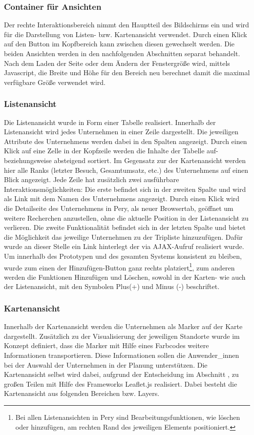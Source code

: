 \documentclass[Bachelorarbeit.tex]{subfiles}
\begin{document}
\subsubsection*{Container für Ansichten}
Der rechte Interaktionsbereich nimmt den Hauptteil des Bildschirms ein und wird für die Darstellung von Listen- bzw. Kartenansicht verwendet. 
Durch einen Klick auf den Button im Kopfbereich kann zwischen diesen gewechselt werden.
Die beiden Ansichten werden in den nachfolgenden Abschnitten separat behandelt.
Nach dem Laden der Seite oder dem Ändern der Fenstergröße wird, mittels Javascript, die Breite und Höhe für den Bereich neu berechnet damit die maximal verfügbare Größe verwendet wird. 

\subsubsection*{Listenansicht}
Die Listenansicht wurde in Form einer Tabelle realisiert.
Innerhalb der Listenansicht wird jedes Unternehmen in einer Zeile dargestellt.
Die jeweiligen Attribute des Unternehmens werden dabei in den Spalten angezeigt.
Durch einen Klick auf eine Zelle in der Kopfzeile werden die Inhalte der Tabelle auf- beziehungsweise absteigend sortiert.
Im Gegensatz zur der Kartenansicht werden hier alle Ranks (letzter Besuch, Gesamtumsatz, etc.) des Unternehmens auf einen Blick angezeigt. 
Jede Zeile hat zusätzlich zwei ausführbare Interaktionsmöglichkeiten:
Die erste befindet sich in der zweiten Spalte und wird als Link mit dem Namen des Unternehmens angezeigt. 
Durch einen Klick wird die Detailseite des Unternehmens in Pery, als neuer Browsertab, geöffnet um weitere Recherchen anzustellen, ohne die aktuelle Position in der Listenansicht zu verlieren.
Die zweite Funktionalität befindet sich in der letzten Spalte und bietet die Möglichkeit das jeweilige Unternehmen zu der Tripliste hinzuzufügen.
Dafür wurde an dieser Stelle ein Link hinterlegt der via \ac{AJAX}-Aufruf realisiert wurde.
Um innerhalb des Prototypen und des gesamten Systems konsistent zu bleiben, wurde zum einen der Hinzufügen-Button ganz rechts platziert\footnote{Bei allen Listenansichten in Pery sind Bearbeitungsfunktionen, wie löschen oder hinzufügen, am rechten Rand des jeweiligen Elements positioniert.}, zum anderen werden die Funktionen Hinzufügen und Löschen, sowohl in der Karten- wie auch der Listenansicht, mit den Symbolen Plus(+) und Minus (-) beschriftet.

\subsubsection*{Kartenansicht} 
Innerhalb der Kartenansicht werden die Unternehmen als Marker auf der Karte dargestellt. 
Zusätzlich zu der Visualisierung der jeweiligen Standorte wurde im Konzept definiert, dass die Marker mit Hilfe eines Farbcodes weitere Informationen transportieren.
Diese Informationen sollen die Anwender\_innen bei der Auswahl der Unternehmen in der Planung unterstützen.
Die Kartenansicht selbst wird dabei, aufgrund der Entscheidung im Abschnitt , zu großen Teilen mit Hilfe des Frameworks Leaflet.js realisiert.
Dabei besteht die Kartenansicht aus folgenden Bereichen bzw. Layers.
\end{document}
